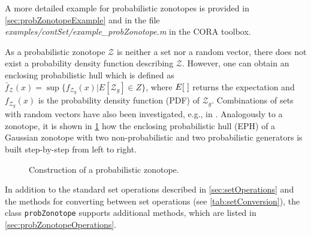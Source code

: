 \begin{center}
\begin{minipage}[t]{0.5\textwidth}
	\vspace{25pt}
	\footnotesize
	
\end{minipage}
\begin{minipage}[t]{0.3\textwidth}
	\vspace{0pt}
	\centering
\end{minipage}
\end{center}

A more detailed example for probabilistic zonotopes is provided in \cref{sec:probZonotopeExample} and in the file \textit{examples/contSet/example\_probZonotope.m} in the CORA toolbox.

As a probabilistic zonotope $\mathscr{Z}$ is neither a set nor a random vector, there does not exist a probability density function describing $\mathscr{Z}$. However, one can obtain an enclosing probabilistic hull which is defined as $\bar{f}_{\mathscr{Z}}(x)=\sup\big\{f_{\mathcal{Z}_g}(x)\big|E[\mathcal{Z}_g]\in Z \big\}$, where $E[\hspace{0.1cm}]$ returns the expectation and $f_{\mathcal{Z}_g}(x)$ is the probability density function (PDF) of $\mathcal{Z}_g$. Combinations of sets with random vectors have also been investigated, e.g., in \cite{Berleant1993}. Analogously to a zonotope, it is shown in \cref{fig_probZonotopesEx} how the enclosing probabilistic hull (EPH) of a Gaussian zonotope with two non-probabilistic and two probabilistic generators is built step-by-step from left to right.

\begin{center}
\begin{figure}[htb]	
		\centering					
      \caption{Construction of a probabilistic zonotope.}
      \label{fig_probZonotopesEx}	
\end{figure}
\end{center}

In addition to the standard set operations described in \cref{sec:setOperations} and the methods for converting between set operations (see \cref{tab:setConversion}), the class \texttt{probZonotope} supports additional methods, which are listed in \cref{sec:probZonotopeOperations}.